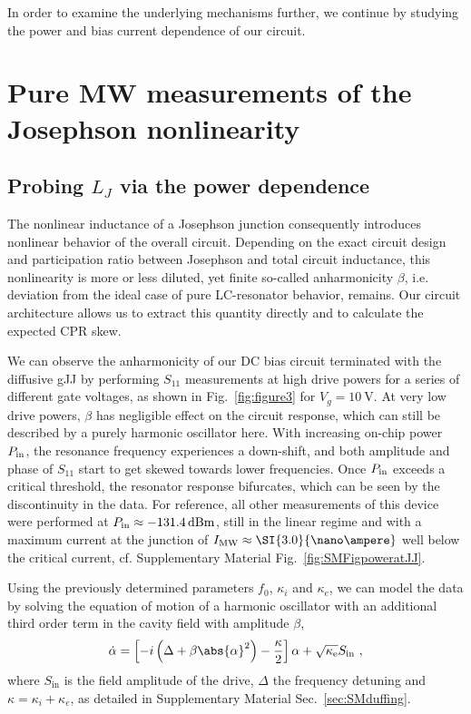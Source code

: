 In order to examine the underlying mechanisms further, we continue by studying the power and bias current dependence of our circuit.



\section{Pure MW measurements of the Josephson nonlinearity}

\subsection{Probing $L_J$ via the power dependence}

The nonlinear inductance of a Josephson junction consequently introduces nonlinear behavior of the overall circuit.
%
Depending on the exact circuit design and participation ratio between Josephson and total circuit inductance, this nonlinearity is more or less diluted, yet finite so-called anharmonicity $\beta$, i.e. deviation from the ideal case of pure LC-resonator behavior, remains.
%
Our circuit architecture allows us to extract this quantity directly and to calculate the expected CPR skew.

We can observe the anharmonicity of our DC bias circuit terminated with the diffusive gJJ by performing $S_{11}$ measurements at high drive powers for a series of different gate voltages, as shown in Fig.~\ref{fig:figure3} for $V_g=\SI{+10}{\volt}$.
%
At very low drive powers, $\beta$ has negligible effect on the circuit response, which can still be described by a purely harmonic oscillator here.
%
With increasing on-chip power $P_{\rm in}$, the resonance frequency experiences a down-shift, and both amplitude and phase of $S_{11}$ start to get skewed towards lower frequencies.
%
Once $P_{\rm in}$ exceeds a critical threshold, the resonator response bifurcates, which can be seen by the discontinuity in the data.
%
For reference, all other measurements of this device were performed at $P_{\rm in}\approx\SI{-131.4}{dBm}$, still in the linear regime and with a maximum current at the junction of $I_{\rm MW}\approx\SI{3.0}{\nano\ampere}$ well below the critical current, cf. Supplementary Material Fig.~\ref{fig:SMFigpoweratJJ}.

Using the previously determined parameters $f_0$, $\kappa_i$ and $\kappa_e$, we can model the data by solving the equation of motion of a harmonic oscillator with an additional third order term in the cavity field with amplitude $\beta$, 
%
\begin{align}
\dot{\alpha} = \left[ -i \left( \Delta+\beta\abs{\alpha}^2 \right)-\frac{\kappa}{2} \right]\alpha + \sqrt{\kappa_\text{e}} S_\text{in}\ ,
\label{eq:Duffing-EOM}
\end{align}
%
where $S_\text{in}$ is the field amplitude of the drive, $\Delta$ the frequency detuning and $\kappa=\kappa_i+\kappa_e$, as detailed in Supplementary Material Sec.~\ref{sec:SMduffing}.


